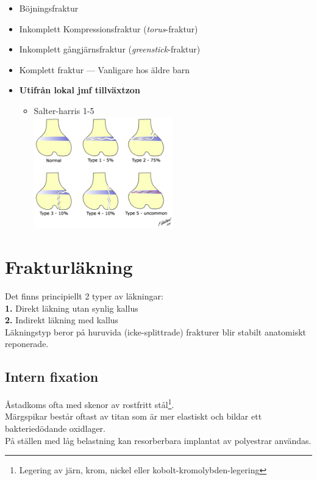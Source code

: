 \documentclass[
  letterpaper,
  DIV=11,
  numbers=noendperiod]{scrreport}
\providecommand{\tightlist}{%
  \setlength{\itemsep}{0pt}\setlength{\parskip}{0pt}}\usepackage{longtable,booktabs,array}
\begin{document}
\begin{itemize}
\tightlist
\item
  Böjningsfraktur
\item
  Inkomplett Kompressionsfraktur (\emph{torus}-fraktur)
\item
  Inkomplett gångjärnsfraktur (\emph{greenstick}-fraktur)
\item
  Komplett fraktur --- Vanligare hos äldre barn
\item
  \textbf{Utifrån lokal jmf tillväxtzon}

  \begin{itemize}
  \tightlist
  \item
    Salter-harris 1-5\\
    \includegraphics[width=0.5\textwidth,height=0.5\textheight]{pics/1280px-SalterHarris.svg.png}
  \end{itemize}
\end{itemize}

\hypertarget{frakturluxe4kning}{%
\section{Frakturläkning}\label{frakturluxe4kning}}

Det finns principiellt 2 typer av läkningar:\\
\textbf{1.} Direkt läkning utan synlig kallus\\
\textbf{2.} Indirekt läkning med kallus\\
Läkningstyp beror på huruvida (icke-splittrade) frakturer blir stabilt
anatomiskt reponerade.

\hypertarget{intern-fixation}{%
\subsection{Intern fixation}\label{intern-fixation}}

Åstadkoms ofta med skenor av rostfritt stål\footnote{Legering av järn,
  krom, nickel eller kobolt-kromolybden-legering}.\\
Märgspikar består oftast av titan som är mer elastiskt och bildar ett
bakteriedödande oxidlager.\\
På ställen med låg belastning kan resorberbara implantat av polyestrar
användas.
\end{document}
